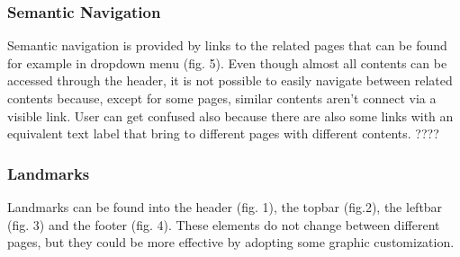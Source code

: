 \subsubsection{Semantic Navigation}
Semantic navigation is provided by links to the related pages that can be found for example in dropdown menu (fig. 5). Even though almost all contents can be accessed through the header, it is not possible to easily navigate between related contents because, except for some pages, similar contents aren't connect via a visible link. User can get confused also because there are also some links with an equivalent text label that bring to different pages with different contents. ????

\subsubsection{Landmarks}
Landmarks can be found into the header (fig. 1), the topbar (fig.2), the leftbar (fig. 3) and the footer (fig. 4). These elements do not change between different pages, but they could be more effective by adopting some graphic customization.